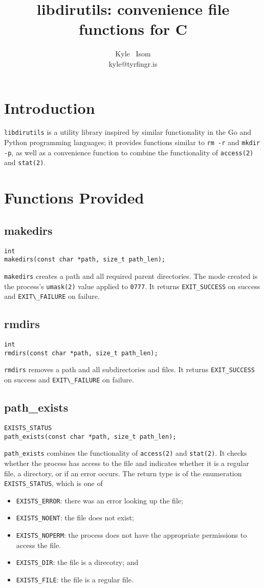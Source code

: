 \documentclass[10pt,letterpaper]{article}
\title{libdirutils: convenience file functions for C}\author{Kyle ~Isom\\kyle@tyrfingr.is}
\begin{document}
\maketitle
\section*{Introduction}
\verb|libdirutils| is a utility library inspired by similar functionality
in the Go and Python programming languages; it provides functions similar
to \verb|rm -r| and \verb|mkdir -p|, as well as a convenience function to
combine the functionality of \verb|access(2)| and \verb|stat(2)|.

\section*{Functions Provided}
\subsection*{makedirs}
\begin{verbatim}
int
makedirs(const char *path, size_t path_len);
\end{verbatim}
\verb|makedirs| creates a path and all required parent directories. The mode
created is the process's \verb|umask(2)| value applied to \verb|0777|.
It returns \verb|EXIT_SUCCESS| on success and \verb|EXIT\_FAILURE| on failure.

\subsection*{rmdirs}
\begin{verbatim}
int
rmdirs(const char *path, size_t path_len);
\end{verbatim}
\verb|rmdirs| removes a path and all subdirectories and files.
It returns \verb|EXIT_SUCCESS| on success and \verb|EXIT\_FAILURE| on failure.

\subsection*{path\_exists}
\begin{verbatim}
EXISTS_STATUS
path_exists(const char *path, size_t path_len);
\end{verbatim}
\verb|path_exists| combines the functionality of \verb|access(2)| and
\verb|stat(2)|. It checks whether the process has access to the file
and indicates whether it is a regular file, a directory, or if an
error occurs. The return type is of the enumeration \verb|EXISTS_STATUS|,
which is one of
\\
\begin{itemize}
  \item \verb|EXISTS_ERROR|: there was an error looking up the file;
  \item \verb|EXISTS_NOENT|: the file does not exist;
  \item \verb|EXISTS_NOPERM|: the process does not have the appropriate
  permissions to access the file.
  \item \verb|EXISTS_DIR|: the file is a direcotry; and
  \item \verb|EXISTS_FILE|: the file is a regular file.
\end{itemize}
\end{document}
